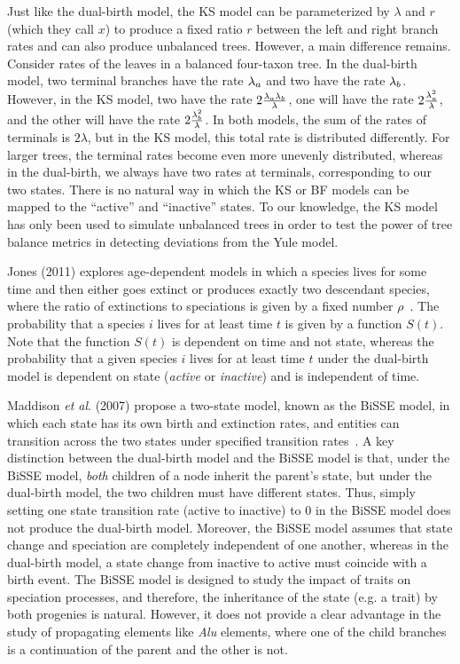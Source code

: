 Just like the dual-birth model, the \gls{KS} model can be parameterized by $\lambda$ and $r$ (which they call $x$) to produce a fixed ratio $r$ between the left and right branch rates and can also produce unbalanced trees. However, a main difference remains. Consider rates of the leaves in a balanced four-taxon tree. In the dual-birth model, two terminal branches have the rate $\lambda_a$ and two have the rate $\lambda_b$. However, in the KS model, two have the rate $2\frac{\lambda_a\lambda_b}{\lambda}$, one will have the rate $2\frac{\lambda_a^2}{\lambda}$, and the other will have the rate $2\frac{\lambda_b^2}{\lambda}$. In both models, the sum of the rates of terminals is $2\lambda$, but in the \gls{KS} model, this total rate is distributed differently. For larger trees, the terminal rates become even more unevenly distributed, whereas in the dual-birth, we always have two rates at terminals, corresponding to our two states. There is no natural way in which the \gls{KS} or \gls{BF} models can be mapped to the ``active'' and ``inactive'' states. To our knowledge, the \gls{KS} model has only been used to simulate unbalanced trees in order to test the power of tree balance metrics in detecting deviations from the Yule model.

Jones (2011) explores age-dependent models in which a species lives for some time and then either goes extinct or produces exactly two descendant species, where the ratio of extinctions to speciations is given by a fixed number $\rho$~\cite{Jones2011}. The probability that a species $i$ lives for at least time $t$ is given by a function $S(t)$. Note that the function $S(t)$ is dependent on time and not state, whereas the probability that a given species $i$ lives for at least time $t$ under the dual-birth model is dependent on state (\textit{active} or \textit{inactive}) and is independent of time.

Maddison \textit{et al}. (2007) propose a two-state model, known as the BiSSE model, in which each state has its own birth and extinction rates, and entities can transition across the two states under specified transition rates~\cite{Maddison2007}. A key distinction between the dual-birth model and the BiSSE model is that, under the BiSSE model, \textit{both} children of a node inherit the parent's state, but under the dual-birth model, the two children must have different states. Thus, simply setting one state transition rate (active to inactive) to 0 in the BiSSE model does not produce the dual-birth model. Moreover, the BiSSE model assumes that state change and speciation are completely independent of one another, whereas in the dual-birth model, a state change from inactive to active must coincide with a birth event. The BiSSE model is designed to study the impact of traits on speciation processes, and therefore, the inheritance of the state (e.g. a trait) by both progenies is natural. However, it does not provide a clear advantage in  the study of propagating elements like \textit{Alu} elements, where one of the child branches is a continuation of the parent and the other is not.

